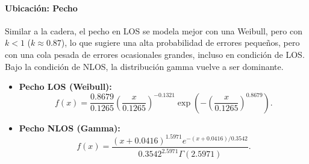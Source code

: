 \paragraph{Ubicación: Pecho}
Similar a la cadera, el pecho en LOS se modela mejor con una Weibull, pero con $k < 1$ ($k \approx 0.87$), lo que sugiere una alta probabilidad de errores pequeños, pero con una cola pesada de errores ocasionales grandes, incluso en condición de LOS. Bajo la condición de NLOS, la distribución gamma vuelve a ser dominante.
%
\begin{itemize}
    \item \textbf{Pecho LOS (Weibull):}
    \begin{equation}
    f(x) = \frac{0.8679}{0.1265} \left(\frac{x}{0.1265}\right)^{-0.1321} \exp\left(-\left(\frac{x}{0.1265}\right)^{0.8679}\right).
    \end{equation}
    
    \item \textbf{Pecho NLOS (Gamma):}
    \begin{equation}
    f(x) = \frac{(x + 0.0416)^{1.5971} e^{-(x + 0.0416)/0.3542}}{0.3542^{2.5971} \Gamma(2.5971)}.
    \end{equation}
\end{itemize}






